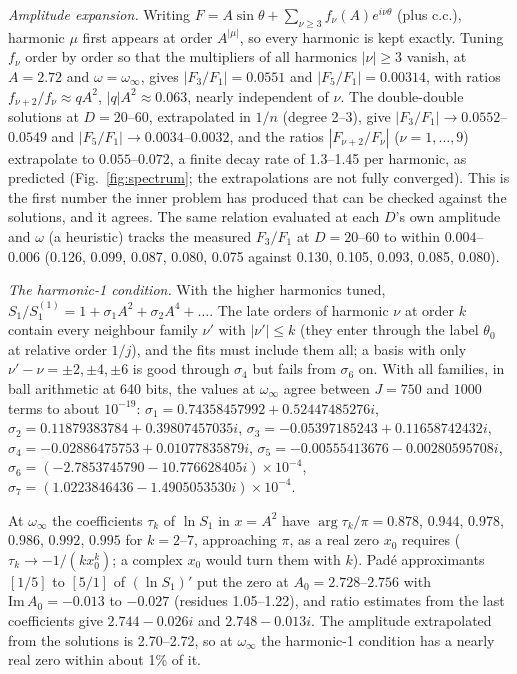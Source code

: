 \documentclass[aps,prd,onecolumn,superscriptaddress,nofootinbib,10pt]{revtex4-2}
\begin{document}
\emph{Amplitude expansion.} Writing $F = A\sin\theta + \sum_{\nu\ge3} f_\nu(A)e^{i\nu\theta}$ (plus c.c.), harmonic $\mu$
first appears at order $A^{|\mu|}$, so every harmonic is kept exactly. Tuning $f_\nu$ order by order so that the
multipliers of all harmonics $|\nu| \ge 3$ vanish, at $A = 2.72$ and $\omega = \omega_\infty$, gives
$|F_3/F_1| = 0.0551$ and $|F_5/F_1| = 0.00314$, with ratios $f_{\nu+2}/f_\nu \approx qA^2$, $|q|A^2 \approx 0.063$, nearly
independent of $\nu$. The double-double solutions at $D = 20$--$60$, extrapolated in $1/n$ (degree 2--3), give
$|F_3/F_1| \to 0.0552$--$0.0549$ and $|F_5/F_1| \to 0.0034$--$0.0032$, and the ratios $|F_{\nu+2}/F_\nu|$
($\nu = 1,\dots,9$) extrapolate to $0.055$--$0.072$, a finite decay rate of 1.3--1.45 per harmonic, as predicted
(Fig.~\ref{fig:spectrum}; the extrapolations are not fully converged). This is the first number the inner problem has
produced that can be checked against the solutions, and it agrees. The same relation evaluated at each $D$'s own
amplitude and $\omega$ (a heuristic) tracks the measured $F_3/F_1$ at $D = 20$--$60$ to within $0.004$--$0.006$ (0.126, 0.099,
0.087, 0.080, 0.075 against 0.130, 0.105, 0.093, 0.085, 0.080).

\emph{The harmonic-1 condition.} With the higher harmonics tuned,
$S_1/S_1^{(1)} = 1 + \sigma_1A^2 + \sigma_2A^4 + \dots$. The late orders of harmonic $\nu$ at order $k$ contain every neighbour
family $\nu'$ with $|\nu'| \le k$ (they enter through the label $\theta_0$ at relative order $1/j$), and the fits must include
them all; a basis with only $\nu' - \nu = \pm2, \pm4, \pm6$ is good through $\sigma_4$ but fails from $\sigma_6$ on. With all
families, in ball arithmetic at 640 bits, the values at $\omega_\infty$ agree between $J = 750$ and $1000$ terms to about
$10^{-19}$: $\sigma_1 = 0.74358457992 + 0.52447485276i$, $\sigma_2 = 0.11879383784 + 0.39807457035i$,
$\sigma_3 = -0.05397185243 + 0.11658742432i$, $\sigma_4 = -0.02886475753 + 0.01077835879i$,
$\sigma_5 = -0.00555413676 - 0.00280595708i$, $\sigma_6 = (-2.7853745790 - 10.776628405i)\times10^{-4}$,
$\sigma_7 = (1.0223846436 - 1.4905053530i)\times10^{-4}$.

At $\omega_\infty$ the coefficients $\tau_k$ of $\ln S_1$ in $x = A^2$ have $\arg\tau_k/\pi = 0.878$, $0.944$, $0.978$, $0.986$,
$0.992$, $0.995$ for $k = 2$--$7$, approaching $\pi$, as a real zero $x_0$ requires ($\tau_k \to -1/(k x_0^k)$; a complex $x_0$
would turn them with $k$). Pad\'e approximants $[1/5]$ to $[5/1]$ of $(\ln S_1)'$ put the zero at $A_0 = 2.728$--$2.756$ with
$\mathrm{Im}\,A_0 = -0.013$ to $-0.027$ (residues 1.05--1.22), and ratio estimates from the last coefficients give
$2.744 - 0.026i$ and $2.748 - 0.013i$. The amplitude extrapolated from the solutions is 2.70--2.72, so at $\omega_\infty$ the
harmonic-1 condition has a nearly real zero within about 1\% of it.
\end{document}
